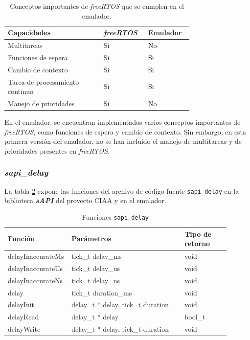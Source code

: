 \begin{table}[h]
\centering
\caption[Conceptos importantes de \textit{freeRTOS} que se cumplen en el emulador.]{Conceptos importantes de \textit{freeRTOS} que se cumplen en el emulador.}
\begin{tabular}{p{0.45\linewidth} p{0.15\linewidth}  p{0.15\linewidth}}
\toprule
\textbf{Capacidades} 
& \textbf{\textit{freeRTOS}}
& \textbf{Emulador}
\\
\midrule
Multitareas & Si & No  \\
Funciones de espera &  Si & Si \\
Cambio de contexto &  Si & Si \\
Tarea de procesamiento continuo &  Si & Si \\
Manejo de prioridades & Si & No  \\
\bottomrule
\hline
\end{tabular}
\label{tab:ConceptosRTOS}
\end{table}

En el emulador, se encuentran implementados varios conceptos importantes de \textit{freeRTOS}, como funciones de espera y cambio de contexto. Sin embargo, en esta primera versión del emulador, no se han incluido el manejo de multitareas y de prioridades presentes en \textit{freeRTOS}.


\subsubsection{\textit{\textbf{sapi\_delay}}}

La tabla \ref{tab:sapiDelay} expone las funciones del archivo de código fuente \texttt{sapi\_delay} en la biblioteca \textit{\textbf{sAPI}} del proyecto CIAA y en el emulador.

\begin{table}[h]
	\centering
	\caption[Funciones \texttt{sapi\_delay}]{Funciones \texttt{sapi\_delay}}
	\begin{tabular}{p{0.20\linewidth} p{0.50\linewidth}  p{0.20\linewidth}}    
		\toprule
		\textbf{Función} 	 & \textbf{Parámetros} 		& \textbf{Tipo de retorno}  \\
		\midrule
		delayInaccurateMs & tick\_t delay\_ms 		&  void \\		
		delayInaccurateUs	 & tick\_t delay\_us			&  void \\
		delayInaccurateNs	 & tick\_t delay\_ns				& void \\
		delay	 & tick\_t duration\_ms				&  void \\
		delayInit & delay\_t * delay, tick\_t duration 		&  void \\
		delayRead & delay\_t * delay 		&  bool\_t \\
		delayWrite & delay\_t * delay, tick\_t duration 		&  void \\	
		\bottomrule
		\hline
	\end{tabular}
	\label{tab:sapiDelay}
\end{table}

